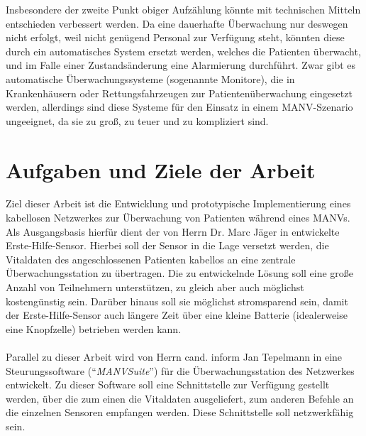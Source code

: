 Insbesondere der zweite Punkt obiger Aufzählung könnte mit technischen Mitteln entschieden
verbessert werden. Da eine dauerhafte Überwachung nur deswegen nicht erfolgt, weil nicht genügend
Personal zur Verfügung steht, könnten diese durch ein automatisches System ersetzt werden, welches
die Patienten überwacht, und im Falle einer Zustandsänderung eine Alarmierung durchführt.
Zwar gibt es automatische Überwachungssysteme (sogenannte Monitore), die in Krankenhäusern oder
Rettungsfahrzeugen zur Patientenüberwachung eingesetzt werden, allerdings sind diese Systeme für
den Einsatz in einem MANV-Szenario ungeeignet, da sie zu groß, zu teuer und zu kompliziert sind.

\section{Aufgaben und Ziele der Arbeit}
Ziel dieser Arbeit ist die Entwicklung und prototypische Implementierung eines
kabellosen Netzwerkes zur Überwachung von Patienten während eines MANVs. Als
Ausgangsbasis hierfür dient der von Herrn Dr. Marc Jäger in \cite{Marc}
entwickelte Erste-Hilfe-Sensor. Hierbei soll der Sensor in die Lage versetzt
werden, die Vitaldaten des angeschlossenen Patienten kabellos an eine zentrale
Überwachungsstation zu übertragen. Die zu entwickelnde Lösung soll eine
große Anzahl von Teilnehmern unterstützen, zu gleich aber auch möglichst kostengünstig
sein. Darüber hinaus soll sie möglichst stromsparend sein, damit der Erste-Hilfe-Sensor
auch längere Zeit über eine kleine Batterie (idealerweise eine Knopfzelle) betrieben 
werden kann.\\
\\
Parallel zu dieser Arbeit wird von Herrn cand. inform Jan Tepelmann in \cite{Jan} eine 
Steurungssoftware ("`\emph{MANVSuite}"') für die Überwachungsstation des Netzwerkes 
entwickelt. Zu dieser Software soll eine Schnittstelle zur Verfügung gestellt werden, über die zum einen
die Vitaldaten ausgeliefert, zum anderen Befehle an die einzelnen Sensoren empfangen 
werden. Diese Schnittstelle soll netzwerkfähig sein. 

